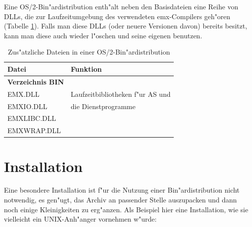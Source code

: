 \documentclass[12pt,a4paper,twoside]{report}
\newcommand{\asname}{AS}
\begin{document}
Eine OS/2-Bin"ardistribution  enth"alt neben den
Basisdateien eine Reihe von DLLs, die zur Laufzeitumgebung des verwendeten
emx-Compilers geh"oren (Tabelle \ref{TabOS2PackageList}).  Falls man diese
DLLs (oder neuere Versionen davon) bereits besitzt, kann man diese auch
wieder l"oschen und seine eigenen benutzen.

\begin{table}[htp]
\begin{center}\begin{tabular}{|l|l|}
\hline
Datei             & Funktion \\
\hline
\hline
{\bf Verzeichnis BIN} & \\
\hline
EMX.DLL           & Laufzeitbibliotheken f"ur \asname{} und \\
EMXIO.DLL         & die Dienstprogramme \\
EMXLIBC.DLL       & \\
EMXWRAP.DLL       & \\
\hline
\end{tabular}\end{center}
\caption{Zus"atzliche Dateien in einer OS/2-Bin"ardistribution
         \label{TabOS2PackageList}}
\end{table}


\section{Installation}

Eine besondere  Installation ist f"ur die Nutzung
einer Bin"ardistribution nicht notwendig, es gen"ugt, das Archiv an
passender Stelle auszupacken und dann noch einige Kleinigkeiten zu
erg"anzen.  Als Beispiel hier eine Installation, wie sie vielleicht
ein UNIX-Anh"anger vornehmen w"urde:
\end{document}
